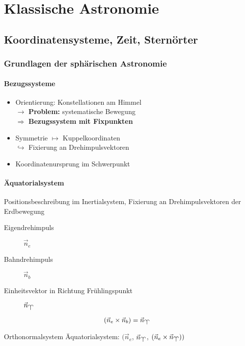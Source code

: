 \part{Klassische Astronomie}
\chapter{Koordinatensysteme, Zeit, Sternörter}
\section{Grundlagen der sphärischen Astronomie}
\subsection{Bezugssysteme}
\begin{itemize}
    \item Orientierung: Konstellationen am Himmel\\
        $\rightarrow$ \textbf{Problem:} systematische Bewegung\\
        $\Rightarrow$ \textbf{Bezugssystem mit Fixpunkten}
    \item Symmetrie $\mapsto$ Kuppelkoordinaten \\
        $\hookrightarrow$ Fixierung an Drehimpulsvektoren
    \item Koordinatenursprung im Schwerpunkt
\end{itemize}

\subsection{Äquatorialsystem}
\begin{goal}
    Positionsbeschreibung im Inertialsystem, Fixierung an Drehimpulsvektoren
    der Erdbewegung
\end{goal}

\begin{description}
    \item[Eigendrehimpuls]  $\vec n_e$
    \item[Bahndrehimpuls]   $\vec n_b$
    \item[Einheitsvektor in Richtung Frühlingspunkt]   $\vec n_{\vernal}$
\end{description}

\begin{equation}
    (\vec n_e \times \vec n_b) = \vec n_{\vernal}
\end{equation}

\begin{definition}
    Orthonormalsystem Äquatorialsystem: $(\vec n_e$, $\vec n_{\vernal}$, $(\vec n_e \times \vec n_{\vernal}))$
\end{definition}

